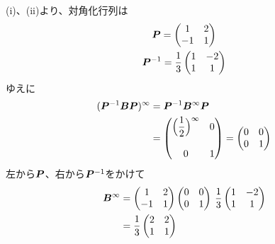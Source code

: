 \begin{ans*}
\begin{enumerate}[label=(\arabic*)]
    (i)、(ii)より、対角化行列\bP は
    \begin{gather}
      \bm{P} =
      \begin{pmatrix}
        1 & 2 \\-1 & 1
      \end{pmatrix} \\
      \bm{P}^{-1} = \frac{1}{3}
      \begin{pmatrix}
        1 & -2 \\1 & 1
      \end{pmatrix} \\
    \end{gather}
    ゆえに
    \begin{align}
      (\bm{P}^{-1}\bm{B}\bm{P})^{\infty} 
      &= \bm{P}^{-1}\bm{B}^{\infty}\bm{P}\\
      &= 
      \begin{pmatrix}
        \Bigl({\displaystyle \frac{1}{2}}\Bigr)^{\infty} & 0 \\ & \\ 0 & 1
      \end{pmatrix} =
      \begin{pmatrix}
        0 & 0 \\ 0 & 1
      \end{pmatrix}
    \end{align}
    左から$\bm{P}$、右から$\bm{P}^{-1}$をかけて
    \begin{align}
      \bm{B}^{\infty}
      &= 
      \begin{pmatrix}
        1 & 2 \\
        -1 & 1 \\
      \end{pmatrix}
      \begin{pmatrix}
        0 & 0 \\
        0 & 1 \\
      \end{pmatrix}
      \:\frac{1}{3}
      \begin{pmatrix}
        1 & -2 \\
        1 & 1 \\
      \end{pmatrix}\\
      &= \frac{1}{3}
      \begin{pmatrix}
        2 & 2 \\
        1 & 1 \\
      \end{pmatrix}
    \end{align}
  \end{enumerate}  
\end{ans*}
